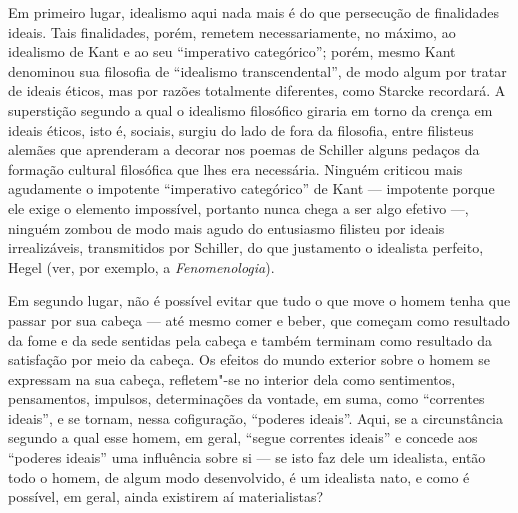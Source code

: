 Em primeiro lugar, idealismo aqui nada mais é do que persecução de
finalidades ideais. Tais finalidades, porém, remetem necessariamente, no
máximo, ao idealismo
de Kant e
ao seu ``imperativo categórico''; porém, %
mesmo Kant 
denominou sua filosofia de ``idealismo transcendental'', de modo algum
por tratar de ideais éticos, mas por razões totalmente diferentes,
como Starcke recordará. A superstição segundo a qual o idealismo
filosófico giraria em torno da crença em ideais éticos, isto é, sociais,
surgiu do lado de fora da filosofia, entre filisteus alemães que
aprenderam a decorar nos poemas
de Schiller alguns %
pedaços da formação cultural filosófica que lhes era necessária. Ninguém
criticou mais agudamente o impotente ``imperativo categórico''
de Kant ---
impotente porque ele exige o elemento impossível, portanto nunca %
chega a ser algo efetivo ---, ninguém zombou de modo mais agudo do
entusiasmo filisteu por ideais irrealizáveis, transmitidos
por Schiller,
do que justamento o idealista perfeito, Hegel (ver, por exemplo,
a \emph{Fenomenologia}).

Em segundo lugar, não é possível evitar que tudo o que move o homem
tenha que passar por sua cabeça --- até mesmo comer e beber, que começam
como resultado da fome e da sede sentidas pela cabeça e também terminam como %
resultado da satisfação por meio da cabeça. Os efeitos do mundo exterior
sobre o homem se expressam na sua cabeça, refletem"-se no interior dela
como sentimentos, pensamentos, impulsos, determinações da vontade, em
suma, como ``correntes ideais'', e se tornam, nessa cofiguração,
``poderes ideais''. Aqui, se a circunstância segundo a qual esse homem, %
em geral, ``segue correntes ideais'' e concede aos ``poderes ideais''
uma influência sobre si --- se isto faz dele um idealista, então todo o
homem, de algum modo desenvolvido, é um idealista nato, e como é
possível, em geral, ainda existirem aí materialistas? %

